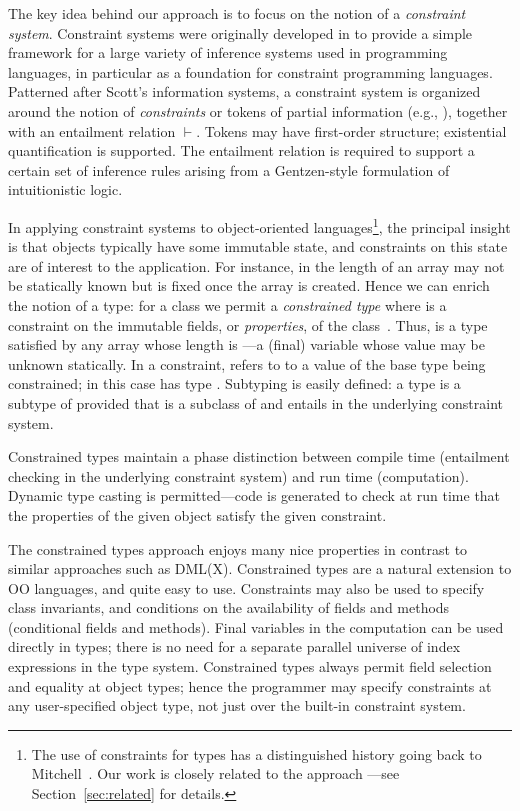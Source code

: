 The key idea behind our approach is to focus on the notion of a {\em
constraint system}. Constraint systems were originally developed in
\cite{cccc} to provide a simple framework for a large variety of
inference systems used in programming languages, in particular as a
foundation for constraint programming languages.  Patterned after
Scott's information systems, a constraint system is
organized around the notion of \emph{constraints} or tokens of partial
information (e.g., ), together with an entailment
relation $\vdash$.  Tokens may have first-order structure; existential
quantification is supported. The entailment relation is required to
support a certain set of inference rules arising from a Gentzen-style
formulation of intuitionistic logic.

In applying constraint systems to object-oriented
languages\footnote{The use of constraints for types has a
distinguished history going back to Mitchell~\cite{mitchell84}.
Our work is closely related to the \hmx{} approach
\cite{sulzmann97type}---see Section~\ref{sec:related} for
details.}, the principal insight
is that objects typically have some immutable state, and constraints on
this state are of interest to the application.  For instance, in \Java{}
the length of an array may not be statically known but is fixed once
the array is created. Hence we can enrich the notion of a type: for a
class  we permit a \emph{constrained type}  where  is a
constraint on the immutable fields, or \emph{properties}, of the
class~\cite{constrained-types}. Thus, 
 is a type satisfied by any array whose length
is ---a (final) variable whose value may be unknown
statically. In a constraint,  refers to 
to a value of the base type being constrained; in this case
 has type .
Subtyping is easily defined: a type  is a
subtype of  
provided that  is a subclass of  and 
entails  in the underlying constraint system.

Constrained types maintain a phase distinction between compile time
(entailment checking in the underlying constraint system) and run time
(computation).  Dynamic type casting is permitted---code is generated
to check at run time that the properties of the given object satisfy
the given constraint.

The constrained types approach enjoys many nice properties in contrast
to similar approaches such as DML(X)\cite{xi99dependent}.  Constrained
types are a natural extension to OO languages, and quite easy to
use. Constraints may also be used to specify class invariants, and
conditions on the availability of fields and methods (conditional
fields and methods).  Final variables in the computation can be used
directly in types; there is no need for a separate parallel universe
of index expressions in the type system.  Constrained types always
permit field selection and equality at object types; hence the
programmer may specify constraints at any user-specified object type,
not just over the built-in constraint system.  

